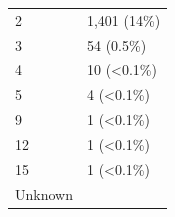 \documentclass[]{article}
\begin{document}
\begin{longtable}[]{@{}ll@{}}
\begin{minipage}[t]{0.71\columnwidth}\raggedright
2\strut
\end{minipage} & \begin{minipage}[t]{0.23\columnwidth}\raggedright
1,401 (14\%)\strut
\end{minipage}\tabularnewline
\begin{minipage}[t]{0.71\columnwidth}\raggedright
3\strut
\end{minipage} & \begin{minipage}[t]{0.23\columnwidth}\raggedright
54 (0.5\%)\strut
\end{minipage}\tabularnewline
\begin{minipage}[t]{0.71\columnwidth}\raggedright
4\strut
\end{minipage} & \begin{minipage}[t]{0.23\columnwidth}\raggedright
10 (\textless{}0.1\%)\strut
\end{minipage}\tabularnewline
\begin{minipage}[t]{0.71\columnwidth}\raggedright
5\strut
\end{minipage} & \begin{minipage}[t]{0.23\columnwidth}\raggedright
4 (\textless{}0.1\%)\strut
\end{minipage}\tabularnewline
\begin{minipage}[t]{0.71\columnwidth}\raggedright
9\strut
\end{minipage} & \begin{minipage}[t]{0.23\columnwidth}\raggedright
1 (\textless{}0.1\%)\strut
\end{minipage}\tabularnewline
\begin{minipage}[t]{0.71\columnwidth}\raggedright
12\strut
\end{minipage} & \begin{minipage}[t]{0.23\columnwidth}\raggedright
1 (\textless{}0.1\%)\strut
\end{minipage}\tabularnewline
\begin{minipage}[t]{0.71\columnwidth}\raggedright
15\strut
\end{minipage} & \begin{minipage}[t]{0.23\columnwidth}\raggedright
1 (\textless{}0.1\%)\strut
\end{minipage}\tabularnewline
\begin{minipage}[t]{0.71\columnwidth}\raggedright
Unknown\strut
\end{minipage} & \begin{minipage}[t]{0.23\columnwidth}\raggedright

\end{minipage}
\end{longtable}
\end{document}
